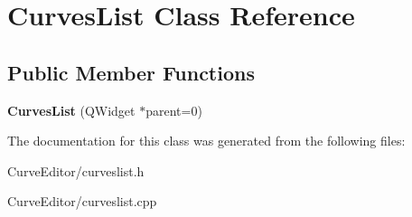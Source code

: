 \hypertarget{class_curves_list}{
\section{\-Curves\-List \-Class \-Reference}
\label{class_curves_list}
}
\subsection*{\-Public \-Member \-Functions}
\begin{DoxyCompactItemize}
\item 
\hypertarget{class_curves_list_a0b0c2ccb9b63ea52e226f5c9d2f6cf02}{
{\bfseries \-Curves\-List} (\-Q\-Widget $\ast$parent=0)}
\label{class_curves_list_a0b0c2ccb9b63ea52e226f5c9d2f6cf02}

\end{DoxyCompactItemize}


\-The documentation for this class was generated from the following files\-:\begin{DoxyCompactItemize}
\item 
\-Curve\-Editor/curveslist.\-h\item 
\-Curve\-Editor/curveslist.\-cpp\end{DoxyCompactItemize}
